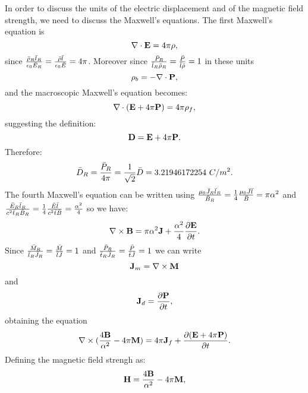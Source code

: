 \documentclass[12pt,a4paper]{article}
\def\bardry{3.21946172254}
\begin{document}
{In order to discuss the units of the electric displacement and of
the magnetic field strength, we need to discuss the Maxwell's equations.
The first Maxwell's equation is
\begin{equation}
\nabla\cdot {\bf E} = 4 \pi \rho,
\end{equation}
since ${\bar \rho_R \bar l_R \over \epsilon_0 \bar E_R}=
{\bar \rho \bar l \over \epsilon_0 \bar E}=4\pi$. Moreover since
${\bar P_R \over \bar l_R \bar \rho_R}={\bar P \over \bar l \bar \rho}=1$
in these units 
\begin{equation}
\rho_b=-\nabla \cdot {\bf P},
\end{equation} 
and the macroscopic Maxwell's equation becomes:
\begin{equation}
\nabla\cdot ({\bf E}+4\pi {\bf P}) = 4 \pi \rho_f,
\end{equation}
suggesting the definition:
\begin{equation}
{\bf D}={\bf E}+4\pi {\bf P}.
\end{equation}
Therefore:
\begin{equation}
\bar D_R={\bar P_R \over 4 \pi} = {1\over \sqrt{2}} \bar D=\bardry\ C/m^2.
\end{equation}
The fourth Maxwell's equation can be written using
${\mu_0 \bar J_R \bar l_R \over \bar B_R}={1\over 4} 
{\mu_0 \bar J \bar l \over \bar B}= \pi \alpha^2$ and
${\bar E_R \bar l_R \over c^2 \bar t_R \bar B_R}={1\over 4}
{\bar E \bar l \over c^2 \bar t \bar B}={\alpha^2 \over 4}$ so we have:
\begin{equation}
\nabla \times {\bf B}= \pi \alpha^2 {\bf J} + {\alpha^2 \over 4}
{\partial {\bf E} \over \partial t}.
\end{equation}
Since ${\bar M_R \over \bar l_R \bar J_R}={\bar M \over \bar l \bar J}=1$
and ${\bar P_R \over \bar t_R \bar J_R}={\bar P \over \bar t \bar J}=1$
we can write
\begin{equation}
{\bf J}_m=\nabla \times {\bf M}
\end{equation}
and
\begin{equation}
{\bf J}_d={\partial {\bf P} \over \partial t},
\end{equation}
obtaining the equation
\begin{equation}
\nabla \times ({4{\bf B} \over \alpha^2}-4 \pi {\bf M})= 4 \pi 
{\bf J}_f + {\partial ({\bf E}+4\pi {\bf P}) \over \partial t}.
\end{equation}
Defining the magnetic field strengh as:
\begin{equation}
{\bf H}={4{\bf B} \over \alpha^2}-4 \pi {\bf M},

\end{equation}}
\end{document}

